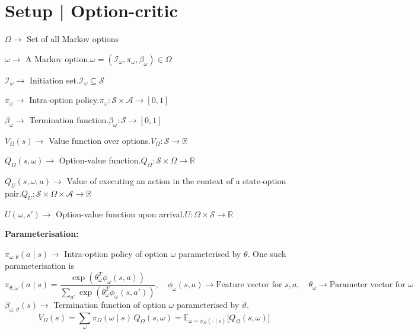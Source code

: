 \section{Setup | Option-critic~\cite{bacon2017option, Sutton1999}}

\( \Omega \to \) Set of all Markov options

\( \omega \to \) A Markov option.\@ \( \omega = (\mathcal{I}_\omega, \pi_\omega, \beta_\omega) \in \Omega \)

\( \mathcal{I}_\omega \to \) Initiation set.\@ \( \mathcal{I}_\omega \subseteq \mathcal{S} \)

\( \pi_\omega \to \) Intra-option policy.\@ \( \pi_\omega: \mathcal{S} \times \mathcal{A} \to [0, 1] \)

\( \beta_\omega \to \) Termination function.\@ \( \beta_\omega: \mathcal{S} \to [0, 1] \)

\( V_\Omega(s) \to \) Value function over options.\@ \( V_\Omega: \mathcal{S} \to \mathbb{R} \)

\( Q_\Omega(s, \omega) \to \) Option-value function.\@ \( Q_\Omega: \mathcal{S} \times \Omega \to \mathbb{R} \)

\( Q_U(s, \omega, a) \to \) Value of executing an action in the context of a state-option pair.\@ \( Q_U: \mathcal{S} \times \Omega \times \mathcal{A} \to \mathbb{R} \)

\( U(\omega, s') \to \) Option-value function upon arrival.\@ \( U: \Omega \times \mathcal{S} \to \mathbb{R} \)

\textbf{Parameterisation:}

\( \pi_{\omega, \theta}(a \mid s) \to \) Intra-option policy of option \( \omega \) parameterised by \( \theta \).
One such parameterisation is
\begin{equation}
    \pi_{\theta, \omega}(a \mid s)
    =
    \frac{\exp(\theta_\omega^T \phi_\omega(s, a))}{\sum_{a'} \exp(\theta_\omega^T \phi_\omega(s, a'))}
    , \quad
    \phi_\omega(s, a)
    \to
    \text{Feature vector for } s, a
    , \quad
    \theta_\omega
    \to
    \text{Parameter vector for } \omega
\end{equation}
\( \beta_{\omega, \vartheta}(s) \to \) Termination function of option \( \omega \) parameterised by \( \vartheta \).
\begin{equation}
    V_\Omega(s)
    =
    \sum_{\omega} \pi_\Omega(\omega \mid s) \, Q_\Omega(s, \omega)
    =
    \mathbb{E}_{\omega \sim \pi_\Omega(\cdot \mid s)} \Big[ Q_\Omega(s, \omega) \Big]
    \label{eq:V_Omega}
\end{equation}

